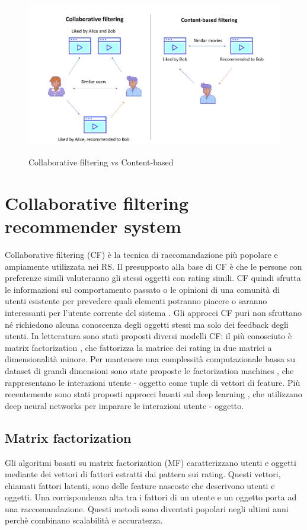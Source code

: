 \begin{figure}
  \centering
  \includegraphics[width=\linewidth]{immagini/cb_cf_schema.png}
  \caption{Collaborative filtering vs Content-based}
  \cite{cf-cb-picture}
  \label{fig:cb-cf}
  
\end{figure}

\section{Collaborative filtering recommender system}
Collaborative filtering (CF) è la tecnica di raccomandazione più popolare e ampiamente utilizzata nei RS. %
Il presupposto alla base di CF è che le persone con preferenze simili valuteranno gli stessi oggetti con rating simili. CF quindi sfrutta le informazioni sul comportamento passato o le opinioni di una comunità di utenti esistente per prevedere quali elementi potranno piacere o saranno interessanti per l'utente corrente del sistema \cite{recsys-intro}. Gli approcci CF puri non sfruttano né richiedono alcuna conoscenza degli oggetti stessi ma solo dei feedback degli utenti. In letteratura sono stati proposti diversi modelli CF: il più conosciuto è matrix factorization \cite{matrix-factorization}, che fattorizza la matrice dei rating in due matrici a dimensionalità minore. Per mantenere una complessità computazionale bassa su dataset di grandi dimensioni sono state proposte le factorization machines \cite{factorization-machines}, che rappresentano le interazioni utente - oggetto come tuple di vettori di feature. Più recentemente sono stati proposti approcci basati sul deep learning \cite{deep-learning-survey} \cite{NCF}, che utilizzano deep neural networks per imparare le interazioni utente - oggetto.

\subsection{Matrix factorization} \label{ssec:mf}
Gli algoritmi basati su matrix factorization (MF) caratterizzano utenti e oggetti mediante dei vettori di fattori estratti dai pattern sui rating. Questi vettori, chiamati fattori latenti, sono delle feature nascoste che descrivono utenti e oggetti. Una corrispondenza alta tra i fattori di un utente e un oggetto porta ad una raccomandazione. Questi metodi sono diventati popolari negli ultimi anni perchè combinano scalabilità e accuratezza. %

